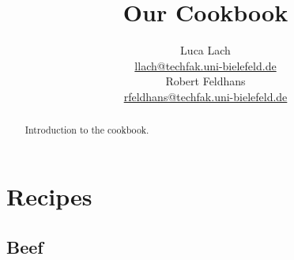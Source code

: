 \documentclass[%
a4paper,
twoside,
11pt
]{report}
\begin{document}
	
	\title{Our Cookbook}
	\author{Luca Lach\\ 
		\href{mailto:llach@techfak.uni-bielefeld.de}{llach@techfak.uni-bielefeld.de}\\
		Robert Feldhans\\ 
		\href{mailto:rfeldhans@techfak.uni-bielefeld.de}{rfeldhans@techfak.uni-bielefeld.de}}
	\maketitle
	
	\begin{abstract}
		Introduction to the cookbook.
	\end{abstract}
	
	
	\tableofcontents
	
	
	
	\if@twoside
		\cleardoublepage
	\else
		\clearpage 
	\fi
	
	\chapter{Recipes}
	\blindtext
	\section{Beef}
	
	
	
	
	
\end{document}
